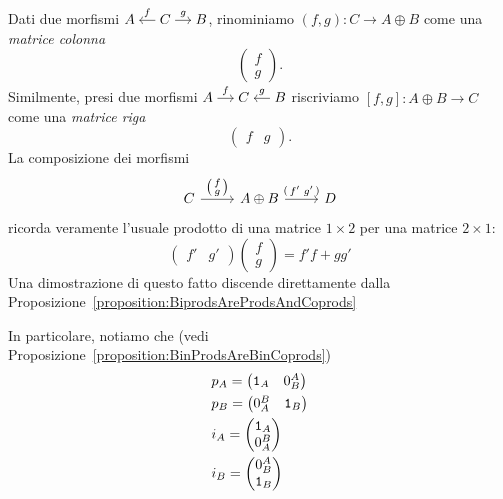 Dati due morfismi
\(\begin{tikzcd}[column sep=small, cramped] A & C \ar["{f}", l, swap]
  \ar["{g}", r] & B
\end{tikzcd}\), rinominiamo \((f, g) : C \to A \oplus B\) come una {\em
  matrice colonna}
\[
  \begin{pmatrix}
    f \\
    g
  \end{pmatrix} .
\]
Similmente, presi due morfismi
\(\begin{tikzcd}[column sep=small, cramped] A \ar["{f}", r] & C & B
  \ar["{g}", l, swap]
\end{tikzcd}\) riscriviamo \([f, g] : A \oplus B \to C\) come una {\em
  matrice riga}
\[
  \begin{pmatrix}
    f & g
  \end{pmatrix} .
\]
La composizione dei morfismi
\[
  \begin{tikzcd}[ampersand replacement=\&]
    C \ar["{\begin{psmallmatrix} f \\ g \end{psmallmatrix}}", r] \& A
    \oplus B \ar["{\begin{psmallmatrix} f' & g' \end{psmallmatrix}}", r]
    \& D
  \end{tikzcd}
\]
ricorda veramente l'usuale prodotto di una matrice \(1 \times 2\) per
una matrice \(2 \times 1\):
\[
  \begin{pmatrix}
    f' & g'
  \end{pmatrix} \begin{pmatrix}
    f \\ g
  \end{pmatrix}
  = f' f + g g'
\]
Una dimostrazione di questo fatto discende direttamente dalla
Proposizione~\ref{proposition:BiprodsAreProdsAndCoprods}

In particolare, notiamo che (vedi
Proposizione~\ref{proposition:BinProdsAreBinCoprods})
\begin{align*}
  & p_A =
    \begin{pmatrix}
      \mathtt 1_A & 0_B^A
    \end{pmatrix} \\
  & p_B =
    \begin{pmatrix}
      0_A^B & \mathtt 1_B
    \end{pmatrix} \\
  & i_A =
    \begin{pmatrix}
      \mathtt 1_A \\ 0_A^B
    \end{pmatrix} \\
  & i_B =
    \begin{pmatrix}
      0_B^A \\ \mathtt 1_B
    \end{pmatrix}
\end{align*}

